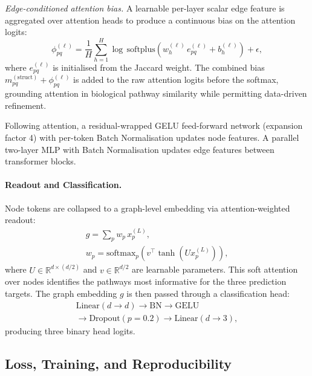 \documentclass[sigconf]{acmart}
\begin{document}
\emph{Edge-conditioned attention bias.} A learnable per-layer scalar
edge feature is aggregated over attention heads to produce a
continuous bias on the attention logits:
\begin{equation}
\phi^{(\ell)}_{pq} = \frac{1}{H} \sum_{h=1}^{H}
\log\,\text{softplus}\!\left(
  w^{(\ell)}_h\, e^{(\ell)}_{pq} + b^{(\ell)}_h
\right) + \epsilon,
\end{equation}
where $e^{(\ell)}_{pq}$ is initialised from the Jaccard weight. The
combined bias $m^{(\text{struct})}_{pq} + \phi^{(\ell)}_{pq}$ is
added to the raw attention logits before the softmax, grounding
attention in biological pathway similarity while permitting
data-driven refinement.

Following attention, a residual-wrapped GELU feed-forward network
(expansion factor 4) with per-token Batch Normalisation updates node
features. A parallel two-layer MLP with Batch Normalisation updates
edge features between transformer blocks.

\paragraph{Readout and Classification.}
Node tokens are collapsed to a graph-level embedding via
attention-weighted readout:
\begin{equation}
\begin{gathered}
g = \sum_{p} w_p\, x_p^{(L)}, \\[4pt]
w_p = \text{softmax}_p\!\left(
        v^\top \tanh\!\left(U x_p^{(L)}\right)
      \right),
\end{gathered}
\end{equation}
where $U \in \mathbb{R}^{d \times (d/2)}$ and $v \in \mathbb{R}^{d/2}$
are learnable parameters. This soft attention over nodes identifies
the pathways most informative for the three prediction targets. The
graph embedding $g$ is then passed through a classification head:
\begin{multline}
\text{Linear}(d \to d) \to \text{BN} \to \text{GELU} \\
\to \text{Dropout}(p=0.2) \to \text{Linear}(d \to 3),
\end{multline}
producing three binary head logits.

\subsection{Loss, Training, and Reproducibility}
\end{document}
